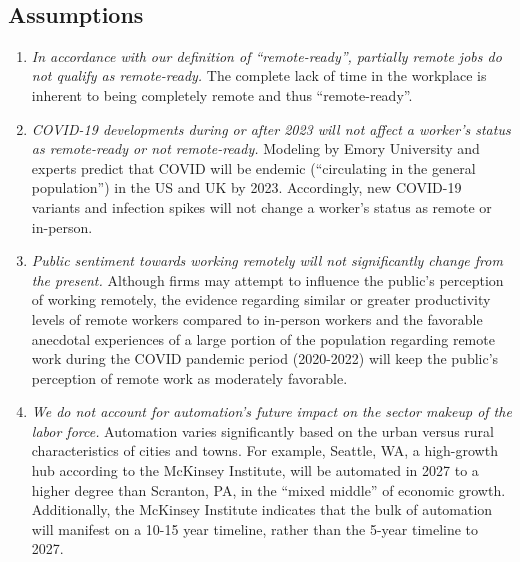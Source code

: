\documentclass{article}
\begin{document}
\

\subsection{Assumptions}
\begin{enumerate}
    \item \textit{In accordance with our definition of “remote-ready”, partially remote jobs do not qualify as remote-ready.} The complete lack of time in the workplace is inherent to being completely remote and thus “remote-ready”.
    
    \item \textit{COVID-19 developments during or after 2023 will not affect a worker’s status as remote-ready or not remote-ready.} Modeling by Emory University \cite{news_2021} and experts \cite{spencekimball_2022} predict that COVID will be endemic (“circulating in the general population”) in the US and UK by 2023. Accordingly, new COVID-19 variants and infection spikes will not change a worker’s status as remote or in-person.
    
    \item \textit{Public sentiment towards working remotely will not significantly change from the present.} Although firms may attempt to influence the public’s perception of working remotely, the evidence regarding similar or greater productivity levels of remote workers compared to in-person workers \cite{wfh} and the favorable anecdotal experiences of a large portion of the population regarding remote work during the COVID pandemic period \cite{owllabs} (2020-2022) will keep the public’s perception of remote work as moderately favorable.
    
    \item \textit{We do not account for automation’s future impact on the sector makeup of the labor force.} Automation varies significantly based on the urban versus rural characteristics of cities and towns. For example, Seattle, WA, a high-growth hub according to the McKinsey Institute, will be automated in 2027 to a higher degree than Scranton, PA, in the “mixed middle” of economic growth.\cite{mckinsey} Additionally, the McKinsey Institute indicates that the bulk of automation will manifest on a 10-15 year timeline, rather than the 5-year timeline to 2027.

\end{enumerate}
\
\end{document}
